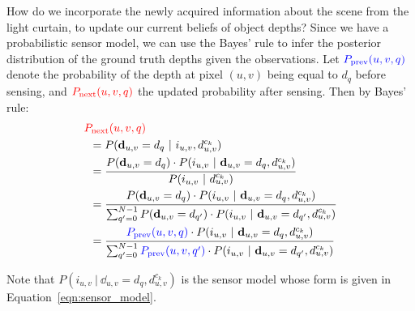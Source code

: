 How do we incorporate the newly acquired information about the scene from the light curtain, to update our current beliefs of object depths? Since we have a probabilistic sensor model, we can use the Bayes' rule to infer the posterior distribution of the ground truth depths given the observations. Let ${\color{blue} P_\text{prev}(u, v, q)}$ denote the probability of the depth at pixel $(u, v)$ being equal to $d_q$ before sensing, and ${\color{red} P_\text{next}(u, v, q)}$ the updated probability after sensing. Then by Bayes' rule:
\begin{align*}
   &\after{q} \\
   &\hspace{5pt}= P(\dd_{u, v} = d_q\ |\ i_{u, v}, d^{c_k}_{u, v}) \\
   &\hspace{5pt}= \frac{P(\dd_{u, v} = d_q) \cdot P(i_{u, v}\ |\ \dd_{u, v} = d_q, d^{c_k}_{u, v})}{P(i_{u, v}\ |\ d^{c_k}_{u, v})}\\
   &\hspace{5pt}= \frac{P(\dd_{u, v} = d_q) \cdot P(i_{u, v}\ |\ \dd_{u, v} = d_q, d^{c_k}_{u, v})}{\sum_{\qb=0}^{N-1} P(\dd_{u, v} = d_{\qb}) \cdot P(i_{u, v}\ |\ \dd_{u, v} = d_{\qb}, d^{c_k}_{u, v})}\\
   &\hspace{5pt}= \frac{\before{q} \cdot P(i_{u, v}\ |\ \dd_{u, v} = d_q, d^{c_k}_{u, v})}{\sum_{\qb=0}^{N-1} \before{\qb} \cdot P(i_{u, v}\ |\ \dd_{u, v} = d_{\qb}, d^{c_k}_{u, v})}
\end{align*}

Note that $P(i_{u, v}\ |\ \dd_{u, v} = d_q, d^{c_k}_{u, v})$ is the sensor model whose form is given in Equation~\ref{eqn:sensor_model}.



